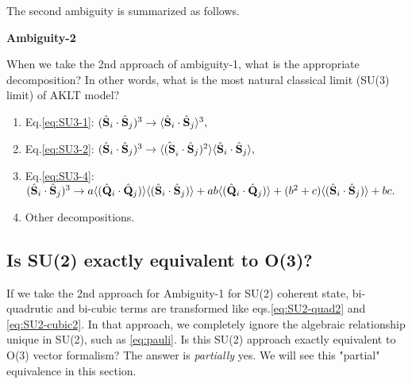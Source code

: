 \documentclass[11pt, aps, longbibliography]{article}
\begin{document}
The second ambiguity is summarized as follows.
\begin{tcolorbox}
    \textbf{Ambiguity-2} 
    
    When we take the 2nd approach of ambiguity-1, what is the appropriate decomposition? 
    In other words, what is the most natural classical limit (SU(3) limit) of AKLT model?
    \begin{enumerate}
        \item Eq.\eqref{eq:SU3-1}: $(\hat{\bold{S}}_i \cdot \hat{\bold{S}}_j)^3 \rightarrow \langle \hat{\bold{S}}_i \cdot \hat{\bold{S}}_j \rangle^3,$
        \item Eq.\eqref{eq:SU3-2}: $(\hat{\bold{S}}_i \cdot \hat{\bold{S}}_j)^3 \rightarrow \langle \hat{(\bold{S}}_i \cdot \hat{\bold{S}}_j)^2 \rangle \langle \hat{\bold{S}}_i \cdot \hat{\bold{S}}_j \rangle,$
        \item Eq.\eqref{eq:SU3-4}: $(\hat{\bold{S}}_i \cdot \hat{\bold{S}}_j)^3 \rightarrow a\langle(\hat{\bold{Q}}_i \cdot \hat{\bold{Q}}_j)\rangle\langle(\hat{\bold{S}}_i \cdot \hat{\bold{S}}_j)\rangle + ab\langle (\hat{\bold{Q}}_i \cdot \hat{\bold{Q}}_j) \rangle + (b^2+c) \langle (\hat{\bold{S}}_i \cdot \hat{\bold{S}}_j) \rangle + bc.$
        \item Other decompositions.
    \end{enumerate}
\end{tcolorbox}

\newpage

\subsection{Is SU(2) exactly equivalent to O(3)?}\label{sec:equivalence}
If we take the 2nd approach for Ambiguity-1 for SU(2) coherent state, bi-quadrutic and bi-cubic terms are transformed like eqs.\eqref{eq:SU2-quad2} and \eqref{eq:SU2-cubic2}.
In that approach, we completely ignore the algebraic relationship unique in SU(2), such as \eqref{eq:pauli}. Is this SU(2) approach exactly equivalent to O(3) vector formalism?
The answer is \emph{partially} yes. We will see this "partial" equivalence in this section.
\end{document}
